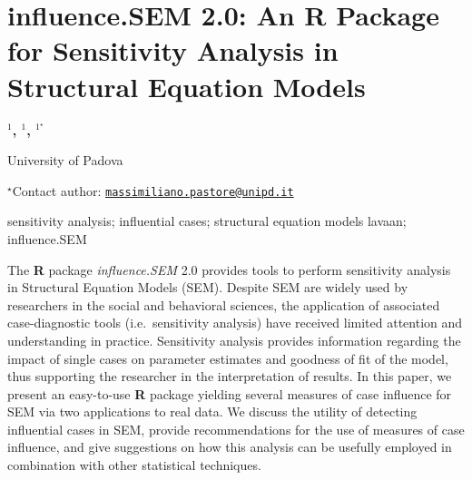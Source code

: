 \documentclass[\main/boa.tex]{subfiles}
\begin{document}
\section{influence.SEM 2.0: An R Package for Sensitivity Analysis in Structural
Equation Models}

\begin{center}
  {\bf {}$^{1}$, $^{1}$, $^{1^\star}$}
\end{center}

\vskip 0.3cm

\begin{affiliations}
\begin{enumerate}
\begin{minipage}{0.915\textwidth}
\centering
\item University of Padova \\[-2pt]
\end{minipage}
\end{enumerate}
$^\star$Contact author: \href{mailto:massimiliano.pastore@unipd.it}{\nolinkurl{massimiliano.pastore@unipd.it}}\\
\end{affiliations}

\vskip 0.5cm

\begin{minipage}{0.915\textwidth}
\keywords sensitivity analysis; influential cases; structural equation models
\packages lavaan; influence.SEM
\end{minipage}

\vskip 0.8cm

The \textbf{R} package \emph{influence.SEM} 2.0 provides tools to
perform sensitivity analysis in Structural Equation Models (SEM).
Despite SEM are widely used by researchers in the social and behavioral
sciences, the application of associated case-diagnostic tools
(i.e.~sensitivity analysis) have received limited attention and
understanding in practice. Sensitivity analysis provides information
regarding the impact of single cases on parameter estimates and goodness
of fit of the model, thus supporting the researcher in the
interpretation of results. In this paper, we present an easy-to-use
\textbf{R} package yielding several measures of case influence for SEM
via two applications to real data. We discuss the utility of detecting
influential cases in SEM, provide recommendations for the use of
measures of case influence, and give suggestions on how this analysis
can be usefully employed in combination with other statistical
techniques.
\end{document}
